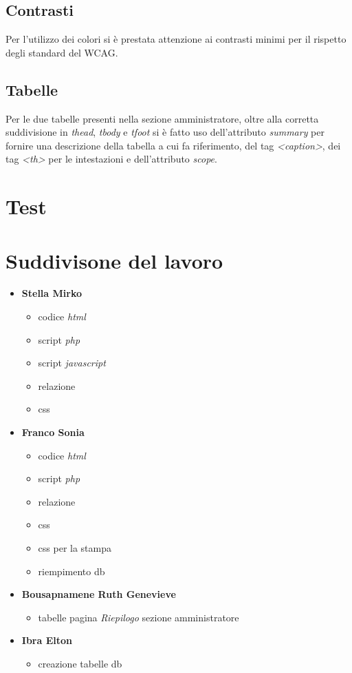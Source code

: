 \documentclass[a4paper]{article}
\begin{document}
\subsection{Contrasti}

Per l'utilizzo dei colori si è prestata attenzione ai contrasti minimi per il rispetto degli standard del WCAG.

\subsection{Tabelle}
Per le due tabelle presenti nella sezione amministratore, oltre alla corretta suddivisione in \textit{thead}, \textit{tbody} e \textit{tfoot} si è fatto uso dell'attributo \textit{summary} per fornire una descrizione della tabella a cui fa riferimento, del tag \textit{<caption>}, dei tag \textit{<th>} per le intestazioni e dell'attributo \textit{scope}.

\section{Test}

\section{Suddivisone del lavoro}

\begin{itemize}
    \item [] \textbf{Stella Mirko}
    \begin{itemize}
        \item codice \textit{html}
        \item script \textit{php}
        \item script \textit{javascript}
        \item relazione
        \item css
    \end{itemize}
    \item [] \textbf{Franco Sonia}
    \begin{itemize}
        \item codice \textit{html}
        \item script \textit{php}
        \item relazione
        \item css
        \item css per la stampa
        \item riempimento db
    \end{itemize}
    \item [] \textbf{Bousapnamene Ruth Genevieve}
    \begin{itemize}
        \item tabelle pagina \textit{Riepilogo} sezione amministratore
    \end{itemize}
    \item [] \textbf{Ibra Elton}
    \begin{itemize}
        \item creazione tabelle db
    \end{itemize}
\end{itemize}
\end{document}

